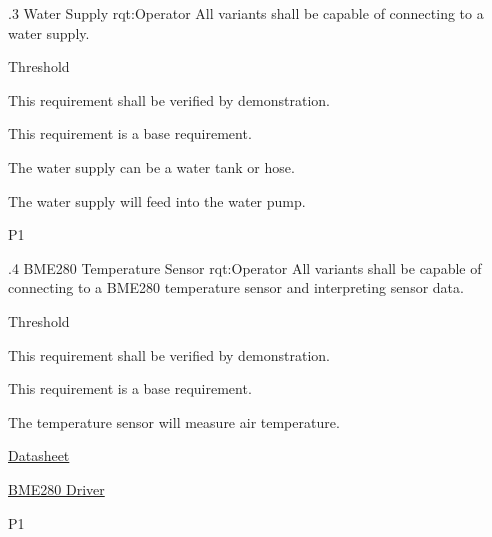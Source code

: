 \ONERQMTVKPP
{\RqtNumberBase.3}
{Water Supply}
{rqt:Operator}
{All \ThisSys variants shall be capable of connecting to a water supply.}
{
	\item [All Phases] Threshold
}
{This requirement shall be verified by demonstration.}
{
	\item [N/A] This requirement is a base requirement.
}
{
  \item The water supply can be a water tank or hose.
  \item The water supply will feed into the water pump.
}
{P1}

\ONERQMTVKPP
{\RqtNumberBase.4}
{BME280 Temperature Sensor}
{rqt:Operator}
{All \ThisSys variants shall be capable of connecting to a BME280 temperature sensor and interpreting sensor data.}
{
	\item [All Phases] Threshold
}
{This requirement shall be verified by demonstration.}
{
	\item [N/A] This requirement is a base requirement.
}
{
  \item The temperature sensor will measure air temperature. 
  \item \href{https://cdn-learn.adafruit.com/assets/assets/000/115/588/original/bst-bme280-ds002.pdf?1664822559}{Datasheet}
  \item \href{https://github.com/adafruit/Adafruit_BME280_Library}{BME280 Driver}
}
{P1}

